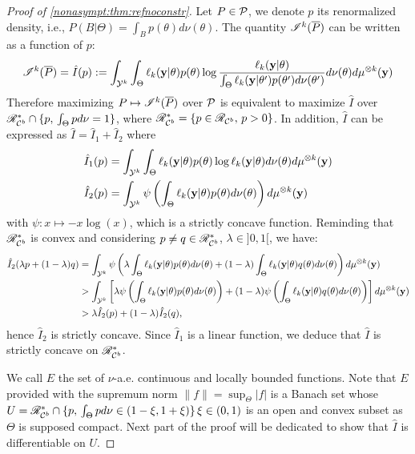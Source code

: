 \begin{proof}[Proof of \cref{nonasympt:thm:refnoconstr}]
    
    Let $P\in\mathcal{P}$, we denote $p$ its renormalized density, i.e., $P(B|\Theta)=\int_Bp(\theta)d\nu(\theta)$. 
    The quantity $\mathscr{I}^k(\overline{P})$ can be written as a function of $p$:
        \begin{equation}
        \mathscr{I}^k(\overline{P}) = \hat I(p) := \int_{\mathcal{Y}^k}\int_\Theta \ell_k(\mathbf{y}|\theta)p(\theta)\log\frac{\ell_k(\mathbf{y}|\theta)}{\int_\Theta \ell_k(\mathbf{y}|\theta') p(\theta')d\nu(\theta')}d\nu(\theta)d\mu^{\otimes k}(\mathbf{y})
    \end{equation}
Therefore maximizing $P\mapsto\mathscr{I}^k(\overline{P})$ over $\mathcal{P}$ is equivalent to maximize $\hat I$ over $\mathscr{R}_{\mathcal{C}^b}^\ast\cap\{p,\,\int_\Theta pd\nu=1\}$, where $\mathscr{R}^\ast_{\mathcal{C}^b}=\{p\in\mathscr{R}_{\mathcal{C}^b},\,p>0\}$. In addition, $\hat I$ can be expressed as $\hat I = \hat I_1 + \hat I_2$ where 
    \begin{align*}
        \hat I_1(p) &= \int_{\mathcal{Y}^k}\int_\Theta \ell_k(\mathbf{y}|\theta)p(\theta)\log \ell_k(\mathbf{y}|\theta)d\nu(\theta)d\mu^{\otimes k}(\mathbf{y})\\
        \hat I_2(p) &= \int_{\mathcal{Y}^k}\psi\left(\int_\Theta \ell_k(\mathbf{y}|\theta)p(\theta)d\nu(\theta)\right)d\mu^{\otimes k}(\mathbf{y})
    \end{align*}
with $\psi:x\mapsto-x\log(x)$, which is a strictly concave function. Reminding that $\mathscr{R}_{\mathcal{C}^b}^\ast$ is convex and considering $p\ne q\in\mathscr{R}_{\mathcal{C}^b}^\ast$, $\lambda\in]0,1[$, we have:
    \begin{align}\nonumber
        \hat I_2(\lambda p + (1-\lambda)q) &= \int_{\mathcal{Y}^k}\psi\left(\lambda\int_\Theta \ell_k(\mathbf{y}|\theta)p(\theta)d\nu(\theta) + (1-\lambda)\int_\Theta \ell_k(\mathbf{y}|\theta)q(\theta)d\nu(\theta)\right)d\mu^{\otimes k}(\mathbf{y})\\
            &>  \int_{\mathcal{Y}^k}\left[\lambda\psi\left(\int_\Theta \ell_k(\mathbf{y}|\theta)p(\theta)d\nu(\theta)\right) + (1-\lambda)\psi\left(\int_\Theta \ell_k(\mathbf{y}|\theta)q(\theta)d\nu(\theta)\right)\right]d\mu^{\otimes k}(\mathbf{y})\\
            &> \lambda\hat I_2(p)+(1-\lambda)\hat I_2(q), \nonumber                
    \end{align}
hence  $\hat I_2$ is strictly concave. Since $\hat I_1$ is a linear function, we deduce that $\hat I$ is strictly concave on $\mathscr{R}_{\mathcal{C}^b}^\ast$.

We call $E$ the set of $\nu$-a.e. continuous  and locally bounded functions.
Note that $E$ provided with the supremum  norm $\|f\|=\sup_\Theta|f|$ is a Banach set whose $U=\mathscr{R}_{\mathcal{C}^b}^\ast\cap\{p,\,\int_\Theta pd\nu\in(1-\xi,1+\xi)\}\,\xi\in(0,1)$ is an open and convex subset as $\Theta$ is supposed compact. Next part of the proof will be dedicated to show that $\hat I$ is differentiable on $U$.%


\end{proof}
